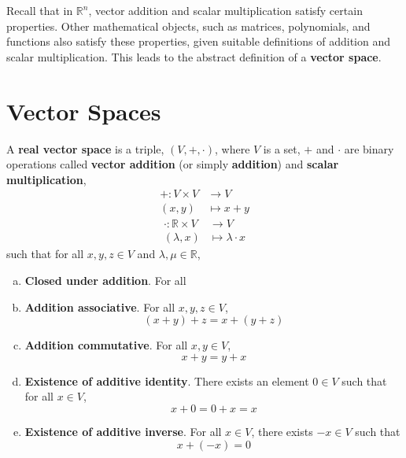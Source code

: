\documentclass[letterpaper,12pt]{article}
\begin{document}
Recall that in $\mathbb{R}^n$, vector addition and scalar multiplication satisfy certain properties. Other mathematical objects, such as matrices, polynomials, and functions also satisfy these properties, given suitable definitions of addition and scalar multiplication. This leads to the abstract definition of a \textbf{vector space}.

\section*{Vector Spaces}
\begin{definition}
A \textbf{real vector space} is a triple, $(V, +, \cdot)$, where $V$ is a set, $+$ and $\cdot$ are binary operations called \textbf{vector addition} (or simply \textbf{addition}) and \textbf{scalar multiplication},
\begin{align*}
    +: V \times V & \longrightarrow V \\
    (x,y) & \longmapsto x + y
\end{align*}
\begin{align*}
    \cdot: \mathbb{R} \times V & \longrightarrow V \\
    (\lambda, x) & \longmapsto \lambda \cdot x
\end{align*}
such that for all $x, y, z \in V$ and $\lambda, \mu \in \mathbb{R}$,
\begin{enumerate}[(a)]
    \item \textbf{Closed under addition}. For all 
    \item \textbf{Addition associative}. For all $x, y, z \in V$,
    \begin{equation*}
        (x + y) + z = x + (y + z)
    \end{equation*}
    \item \textbf{Addition commutative}. For all $x, y \in V$,
    \begin{equation*}
        x + y = y + x
    \end{equation*}
    \item \textbf{Existence of additive identity}. There exists an element $0 \in V$ such that for all $x \in V$,
    \begin{equation*}
        x + 0 = 0 + x = x
    \end{equation*}
    \item \textbf{Existence of additive inverse}. For all $x \in V$, there exists $-x \in V$ such that
    \begin{equation*}
        x + (-x) = 0
    \end{equation*}

\end{enumerate}
\end{definition}
\end{document}
